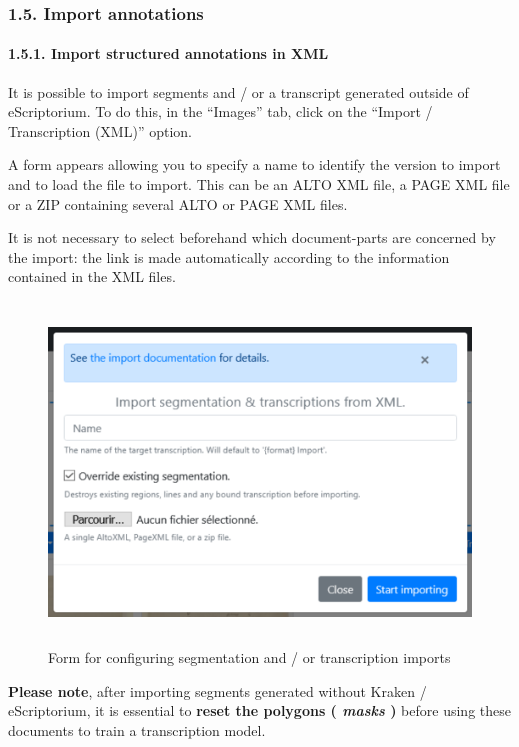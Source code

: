\documentclass[
]{book}
\begin{document}
\hypertarget{import-annotations}{%
\subsubsection{1.5. Import annotations}\label{import-annotations}}

\hypertarget{import-structured-annotations-in-xml}{%
\paragraph{1.5.1. Import structured annotations in XML}\label{import-structured-annotations-in-xml}}

It is possible to import segments and / or a transcript generated
outside of eScriptorium. To do this, in the ``Images'' tab, click on the
``Import / Transcription (XML)'' option.

A form appears allowing you to specify a name to identify the version to
import and to load the file to import. This can be an ALTO XML file, a
PAGE XML file or a ZIP containing several ALTO or PAGE XML files.

It is not necessary to select beforehand which document-parts are
concerned by the import: the link is made automatically according to the
information contained in the XML files.

\begin{figure}
\centering
\includegraphics[width=5.20833in,height=3.56944in]{img/eScrTut/image16.png}
\caption{Form for configuring segmentation and / or transcription
imports}
\end{figure}

\textbf{Please note}, after importing segments generated without Kraken /
eScriptorium, it is essential to \textbf{reset the polygons ( \emph{masks} )}
before using these documents to train a transcription model.
\end{document}

